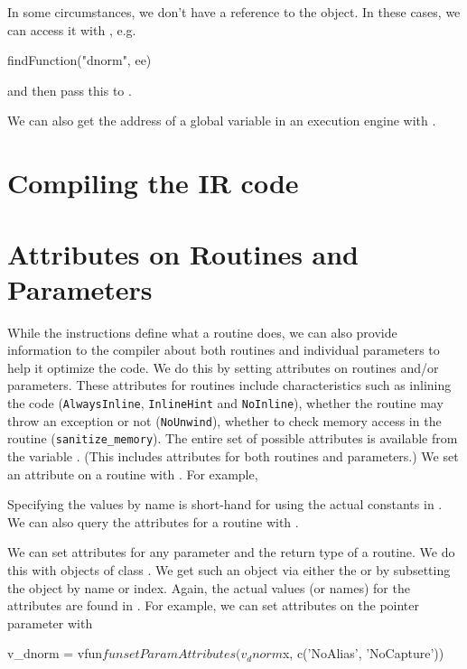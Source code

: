 \documentclass[article]{jss}
\def\LLVMAttr#1{\texttt{#1}}
\begin{document}
In some circumstances, we don't have a reference to the
 object. In these cases, we can access it with
, e.g.
\begin{RCode}
findFunction("dnorm", ee)
\end{RCode}
and then pass this to .

We can also get the address of a global variable in an execution
engine with .


\section{Compiling the IR code}


\section{Attributes on Routines and Parameters}
While the instructions define what a routine does, we can also provide
information to the \llvm{} compiler about both routines and individual
parameters to help it optimize the code.  We do this by setting
attributes on routines and/or parameters.  These attributes for
routines include characteristics such as inlining the code
(\LLVMAttr{AlwaysInline}, \LLVMAttr{InlineHint} and \LLVMAttr{NoInline}), whether the routine may throw
an exception or not (\LLVMAttr{NoUnwind}), whether to check memory access in the
routine (\verb+sanitize_memory+).
The entire set of possible attributes is available from the variable
. (This includes attributes
for both routines and parameters.)
We set an attribute on a routine with .
For example, 
Specifying the values by name is short-hand for using the actual
constants in .
We can also query the attributes for a routine with
.

We can set attributes for any parameter and the
return type of a routine. %
We do this with objects of class .
We get such an object via either the  or 
by subsetting the  object by name or index.
Again, the actual values (or names) for the attributes are found in
.
For example, we can set attributes on the pointer parameter 
with
\begin{RCode}
v_dnorm = vfun$fun
setParamAttributes(v_dnorm$x, c('NoAlias', 'NoCapture'))
\end{RCode}
\end{document}
